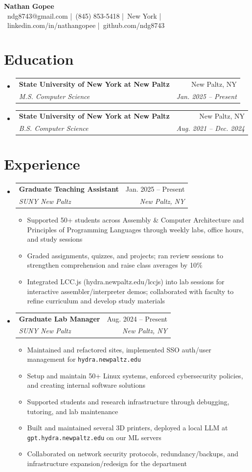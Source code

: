\documentclass[letterpaper,11pt]{article}
\makeatletter
\newcommand{\resumeItem}[1]{\item\small{#1}}
\newcommand{\resumeSubheading}[4]{
  \vspace{-2pt}\item
  \begin{tabular*}{0.97\textwidth}[t]{l@{\extracolsep{\fill}}r}
    \textbf{#1} & #2 \\
    \textit{#3} & \textit{#4} \\
  \end{tabular*}\vspace{-2pt}
}
\newcommand{\resumeSubHeadingListStart}{\begin{itemize}[label={},parsep=0pt]}
\newcommand{\resumeSubHeadingListEnd}{\end{itemize}}
\makeatother
\begin{document}
\begin{center}\vspace{-6pt}
  {\Huge\bfseries Nathan Gopee}\\
  {\scriptsize\faEnvelope\ ndg8743@gmail.com \quad|\quad\faPhone*\ (845) 853-5418 \quad|\quad\faMapMarker*\ New York \quad|\quad\faLinkedin\ linkedin.com/in/nathangopee \quad|\quad\faGithub\ github.com/ndg8743}\\[ -6pt]
\end{center}

\section{Education}
\resumeSubHeadingListStart
  \resumeSubheading{State University of New York at New Paltz}{New Paltz, NY}{M.S. Computer Science}{Jan. 2025 -- Present}
  \resumeSubheading{State University of New York at New Paltz}{New Paltz, NY}{B.S. Computer Science}{Aug. 2021 -- Dec. 2024}
\resumeSubHeadingListEnd

\vspace{-8pt}
\section{Experience}
\resumeSubHeadingListStart
  \resumeSubheading{Graduate Teaching Assistant}{Jan. 2025 -- Present}{SUNY New Paltz}{New Paltz, NY}
    \begin{itemize}
      \resumeItem{Supported 50+ students across Assembly \& Computer Architecture and Principles of Programming Languages through weekly labs, office hours, and study sessions}
      \resumeItem{Graded assignments, quizzes, and projects; ran review sessions to strengthen comprehension and raise class averages by 10\%}
      \resumeItem{Integrated LCC.js (hydra.newpaltz.edu/lccjs) into lab sessions for interactive assembler/interpreter demos; collaborated with faculty to refine curriculum and develop study materials}
    \end{itemize}


  \resumeSubheading{Graduate Lab Manager}{Aug. 2024 -- Present}{SUNY New Paltz}{New Paltz, NY}
    \begin{itemize}
      \resumeItem{Maintained and refactored sites, implemented SSO auth/user management for \texttt{hydra.newpaltz.edu}}
      \resumeItem{Setup and maintain 50+ Linux systems, enforced cybersecurity policies, and creating internal software solutions}
      \resumeItem{Supported students and research infrastructure through debugging, tutoring, and lab maintenance}
      \resumeItem{Built and maintained several 3D printers, deployed a local LLM at \texttt{gpt.hydra.newpaltz.edu} on our ML servers}
      \resumeItem{Collaborated on network security protocols, redundancy/backups, and infrastructure expansion/redesign for the department}
    \end{itemize}
\resumeSubHeadingListEnd
\end{document}
